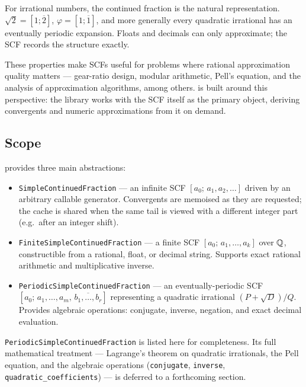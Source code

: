 For irrational numbers, the continued fraction is the natural representation.
$\sqrt{2} = [1;\overline{2}]$, $\varphi = [1;\overline{1}]$, and more generally
every quadratic irrational has an eventually periodic expansion.  Floats and
decimals can only approximate; the SCF records the structure exactly.

These properties make SCFs useful for problems where rational approximation
quality matters — gear-ratio design, modular arithmetic, Pell's equation, and
the analysis of approximation algorithms, among others.  \catena is built around
this perspective: the library works with the SCF itself as the primary object,
deriving convergents and numeric approximations from it on demand.

\subsection{Scope}

\catena provides three main abstractions:

\begin{itemize}[nosep]
  \item \texttt{SimpleContinuedFraction} — an infinite SCF $[a_0;\,a_1,a_2,\ldots]$
        driven by an arbitrary callable generator.  Convergents are memoised as they
        are requested; the cache is shared when the same tail is viewed with a different
        integer part (e.g.\ after an integer shift).
  \item \texttt{FiniteSimpleContinuedFraction} — a finite SCF
        $[a_0;\,a_1,\ldots,a_k]$ over $\mathbb{Q}$, constructible from a rational, float,
        or decimal string.  Supports exact rational arithmetic and multiplicative inverse.
  \item \texttt{PeriodicSimpleContinuedFraction} — an eventually-periodic SCF
        $[a_0;\,a_1,\ldots,a_m,\,\overline{b_1,\ldots,b_r}]$ representing a quadratic
        irrational $(P + \sqrt{D})/Q$.  Provides algebraic operations: conjugate,
        inverse, negation, and exact decimal evaluation.
\end{itemize}

\begin{remark}
  \texttt{PeriodicSimpleContinuedFraction} is listed here for completeness.
  Its full mathematical treatment — Lagrange's theorem on quadratic irrationals,
  the Pell equation, and the algebraic operations
  (\texttt{conjugate}, \texttt{inverse}, \texttt{quadratic\_coefficients}) —
  is deferred to a forthcoming section.
\end{remark}

